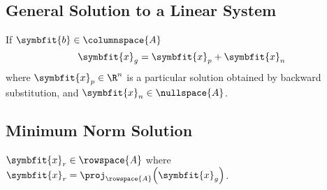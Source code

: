 \documentclass{article}
\begin{document}
\begin{multicols*}{3}
    \subsection{General Solution to a Linear System}
    If \(\symbfit{b} \in \columnspace{A}\)
    \begin{equation*}
        \symbfit{x}_g = \symbfit{x}_p + \symbfit{x}_n
    \end{equation*}
    where \(\symbfit{x}_p \in \R^n\) is a particular solution obtained by backward substitution, and
    \(\symbfit{x}_n \in \nullspace{A}\).
    \subsection{Minimum Norm Solution}
    \(\symbfit{x}_r \in \rowspace{A}\) where \(\symbfit{x}_r = \proj_{\rowspace{A}}{\left( \symbfit{x}_g \right)}\).

\end{multicols*}
\end{document}

